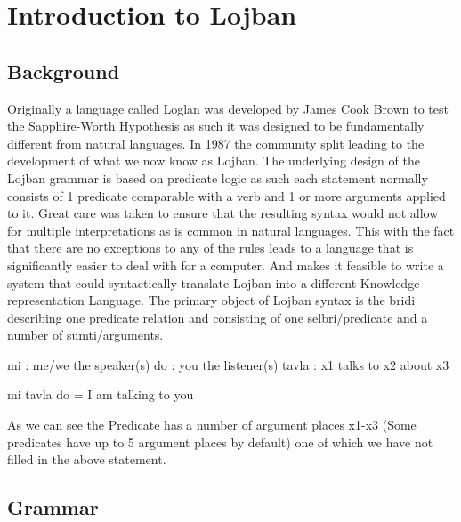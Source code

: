 
\chapter{Introduction to Lojban} %

\label{Chapter1} %


\newcommand{\keyword}[1]{\textbf{#1}}
\newcommand{\tabhead}[1]{\textbf{#1}}
\newcommand{\code}[1]{\texttt{#1}}
\newcommand{\file}[1]{\texttt{\bfseries#1}}
\newcommand{\option}[1]{\texttt{\itshape#1}}


\section{Background}

Originally a language called Loglan was developed by James Cook Brown to test the Sapphire-Worth Hypothesis as such it was designed to be fundamentally different from natural languages. In 1987 the community split leading to the development of what we now know as Lojban. The underlying design of the Lojban grammar is based on predicate logic as such each statement normally consists of 1 predicate comparable with a verb and 1 or more arguments applied to it. Great care was taken to ensure that the resulting syntax would not allow for multiple interpretations as is common in natural languages. This with the fact that there are no exceptions to any of the rules leads to a language that is significantly easier to deal with for a computer. And makes it feasible to write a system that could syntactically translate Lojban into a different Knowledge representation Language.
The primary object of Lojban syntax is the bridi describing one predicate relation and consisting of one selbri/predicate and a number of sumti/arguments.

mi : me/we the speaker(s)
do : you the listener(s)
tavla : x1 talks to x2 about x3

mi tavla do = I am talking to you

As we can see the Predicate has a number of argument places x1-x3 (Some predicates have up to 5 argument places by default) one of which we have not filled in the above statement.
\section{Grammar}
